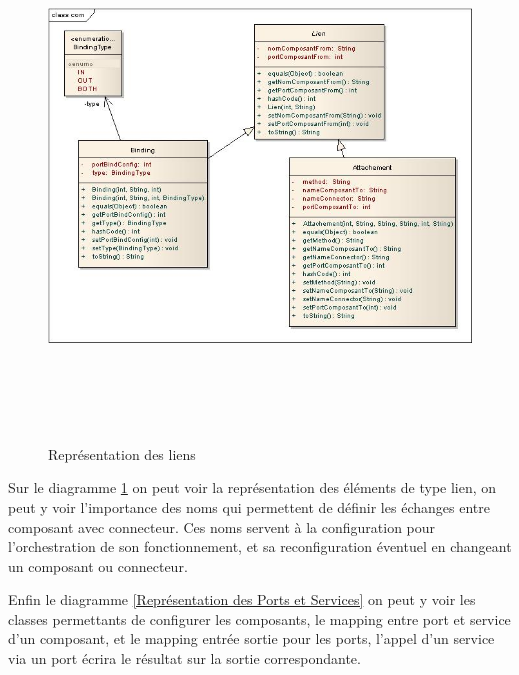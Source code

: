 \documentclass[11pt,a4paper]{article}
\begin{document}
\begin{figure}[h]
  		\centering
  		\includegraphics[height=14cm,width=15cm]{comimpl.jpg}
  		\caption{Représentation des liens}
  		\label{Représentation des liens}
\end{figure}

Sur le diagramme \ref{Représentation des liens} on peut voir la représentation des éléments de type lien, on peut y voir l'importance des noms qui permettent de définir les échanges entre composant avec connecteur. Ces noms servent à la configuration pour l'orchestration de son fonctionnement, et sa reconfiguration éventuel en changeant un composant ou connecteur.

Enfin le diagramme \ref{Représentation des Ports et Services} on peut y voir les classes permettants de configurer les composants, le mapping entre port et service d'un composant, et le mapping entrée sortie pour les ports, l'appel d'un service via un port écrira le résultat sur la sortie correspondante.
\end{document}
